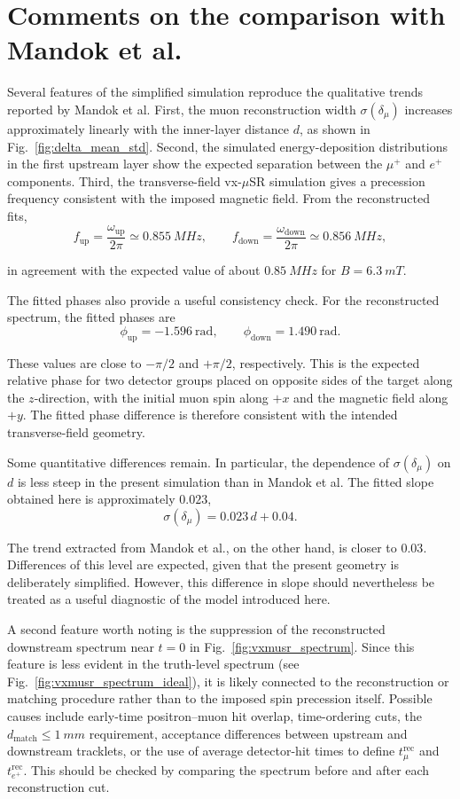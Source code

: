 \documentclass[11pt,a4paper]{article}
\begin{document}

\FloatBarrier

\section{Comments on the comparison with Mandok et al.}

Several features of the simplified simulation reproduce the qualitative trends reported by Mandok et al. First, the muon reconstruction width $\sigma(\delta_\mu)$ increases approximately linearly with the inner-layer distance $d$, as shown in Fig.~\ref{fig:delta_mean_std}. Second, the simulated energy-deposition distributions in the first upstream layer show the expected separation between the $\mu^+$ and $e^+$ components. Third, the transverse-field vx-$\mu$SR simulation gives a precession frequency consistent with the imposed magnetic field. From the reconstructed fits,
$$
f_{\mathrm{up}}=\frac{\omega_{\mathrm{up}}}{2\pi} \simeq \SI{0.855}{MHz}, \qquad f_{\mathrm{down}}=\frac{\omega_{\mathrm{down}}}{2\pi} \simeq \SI{0.856}{MHz},
$$

\noindent in agreement with the expected value of about $\SI{0.85}{MHz}$ for $B=\SI{6.3}{mT}$.

The fitted phases also provide a useful consistency check. For the reconstructed spectrum, the fitted phases are
$$\phi_{\mathrm{up}}=-1.596~\mathrm{rad}, \qquad \phi_{\mathrm{down}}=1.490~\mathrm{rad}.$$

\noindent These values are close to $-\pi/2$ and $+\pi/2$, respectively. This is the expected relative phase for two detector groups placed on opposite sides of the target along the $z$-direction, with the initial muon spin along $+x$ and the magnetic field along $+y$. The fitted phase difference is therefore consistent with the intended transverse-field geometry.

Some quantitative differences remain. In particular, the dependence of $\sigma(\delta_\mu)$ on $d$ is less steep in the present simulation than in Mandok et al. The fitted slope obtained here is approximately $0.023$,
$$ \sigma(\delta_\mu) = 0.023\, d+0.04. $$

\noindent The trend extracted from Mandok et al., on the other hand, is closer to $0.03$. Differences of this level are expected, given that the present geometry is deliberately simplified. However, this difference in slope should nevertheless be treated as a useful diagnostic of the model introduced here. 

A second feature worth noting is the suppression of the reconstructed downstream spectrum near $t=0$ in Fig.~\ref{fig:vxmusr_spectrum}. Since this feature is less evident in the truth-level spectrum (see Fig.~\ref{fig:vxmusr_spectrum_ideal}), it is likely connected to the reconstruction or matching procedure rather than to the imposed spin precession itself. Possible causes include early-time positron--muon hit overlap, time-ordering cuts, the $d_{\mathrm{match}}\leq\SI{1}{mm}$ requirement, acceptance differences between upstream and downstream tracklets, or the use of average detector-hit times to define $t^{\mathrm{rec}}_\mu$ and $t^{\mathrm{rec}}_{e^+}$. This should be checked by comparing the spectrum before and after each reconstruction cut.
\end{document}
